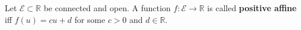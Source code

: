Let $\mathcal{E} \subset \mathbb{R}$ be connected and open. A function $f: \mathcal{E} \rightarrow \mathbb{R}$ is called \textbf{positive affine} iff $f(u) = cu + d$ for some $c > 0$ and $d \in \mathbb{R}$.
